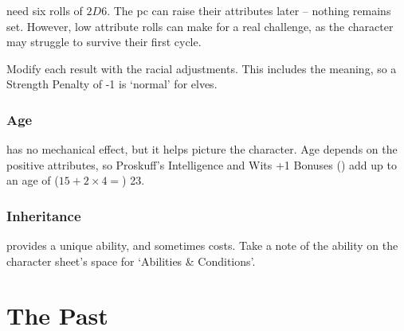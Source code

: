 \begin{multicols}{2}

\subsubsection{}
need six rolls of $2D6$.
The \gls{pc} can raise their \glspl{attribute} later -- nothing remains set.
However, low \gls{attribute} rolls can make for a real challenge, as the character may struggle to survive their first \gls{cycle}.

\label{randomAttributes}
\attributeChart

Modify each result with the racial adjustments.
This includes the meaning, so a Strength Penalty of -1 is `normal' for elves.

\subsubsection{Age}
has no mechanical effect, but it helps picture the character.
Age depends on the positive \glspl{attribute}, so Proskuff's Intelligence and Wits +1 Bonuses () add up to an age of ($15 + 2\times 4 =$) 23.

\raceAgeChart

\subsubsection{Inheritance}
\label{racialAbility}
provides a unique ability, and sometimes costs.
Take a note of the ability on the character sheet's space for `Abilities \& Conditions'.

\raceAbilitiesChart

\end{multicols}

\exampleRandomCharacter %

\section{The Past}
\label{enlistment}


